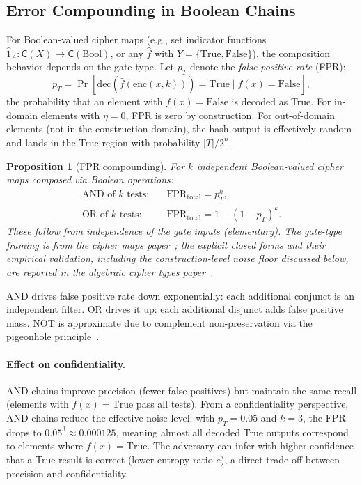 \documentclass[11pt]{article}
\theoremstyle{definition}
\theoremstyle{plain}
\newtheorem{proposition}[theorem]{Proposition}
\theoremstyle{remark}
\newcommand{\fhat}{\hat{f}}
\newcommand{\enc}{\mathrm{enc}}
\newcommand{\dec}{\mathrm{dec}}
\newcommand{\cipher}[1]{\mathsf{C}(#1)}
\begin{document}
\subsection{Error Compounding in Boolean Chains}
\label{subsec:fpr-compounding}

For Boolean-valued cipher maps (e.g., set indicator functions
$\hat{1}_A : \cipher{X} \to \cipher{\mathrm{Bool}}$, or any
$\fhat$ with $Y = \{\mathrm{True}, \mathrm{False}\}$), the
composition behavior depends on the gate type.  Let $p_T$ denote the
\emph{false positive rate} (FPR):
\[
p_T = \Pr[\dec(\fhat(\enc(x,k))) = \mathrm{True} \mid f(x) = \mathrm{False}],
\]
the probability that an element with $f(x) = \mathrm{False}$ is
decoded as True.
For in-domain elements with $\eta = 0$, FPR is zero by construction.
For out-of-domain elements (not in the construction domain), the hash
output is effectively random and lands in the True region with
probability $|T|/2^n$.

\begin{proposition}[FPR compounding]
\label{thm:fpr-compounding}
For $k$ independent Boolean-valued cipher maps composed via Boolean
operations:
\begin{align}
\text{AND of } k \text{ tests:} &\quad
  \mathrm{FPR}_{\mathrm{total}} = p_T^k, \\
\text{OR of } k \text{ tests:} &\quad
  \mathrm{FPR}_{\mathrm{total}} = 1 - (1 - p_T)^k.
\end{align}
These follow from independence of the gate inputs (elementary).  The
gate-type framing is from the cipher maps
paper~\cite[Sec.~7.4]{towell2026cipher}; the explicit closed forms and
their empirical validation, including the construction-level noise
floor discussed below, are reported in the algebraic cipher types
paper~\cite[Table~3]{towell2026algebraic}.
\end{proposition}

AND drives false positive rate down exponentially: each additional
conjunct is an independent filter.  OR drives it up: each additional
disjunct adds false positive mass.  NOT is approximate due to
complement non-preservation via the pigeonhole
principle~\cite{towell2026cipher}.

\paragraph{Effect on confidentiality.}
AND chains improve precision (fewer false positives) but maintain the
same recall (elements with $f(x) = \mathrm{True}$ pass all tests).
From a confidentiality perspective, AND chains reduce the effective noise
level: with $p_T = 0.05$ and $k = 3$, the FPR drops to
$0.05^3 \approx 0.000125$, meaning almost all decoded True outputs
correspond to elements where $f(x) = \mathrm{True}$.
The adversary can infer with higher confidence that a True result is
correct (lower entropy ratio $e$), a direct trade-off between precision
and confidentiality.
\end{document}

